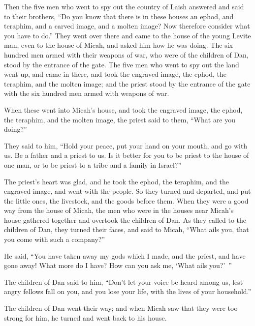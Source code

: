 {\par }{\PP {}Then the five men who went to spy out the country of Laish answered and said to their brothers, “Do you know that there is in these houses an ephod, and teraphim, and a carved image, and a molten image? Now therefore consider what you have to do.”
They went over there and came to the house of the young Levite man, even to the house of Micah, and asked him how he was doing.
The six hundred men armed with their weapons of war, who were of the children of Dan, stood by the entrance of the gate.
The five men who went to spy out the land went up, and came in there, and took the engraved image, the ephod, the teraphim, and the molten image; and the priest stood by the entrance of the gate with the six hundred men armed with weapons of war.
\par }{\PP {}When these went into Micah’s house, and took the engraved image, the ephod, the teraphim, and the molten image, the priest said to them, “What are you doing?”
\par }{\PP {}They said to him, “Hold your peace, put your hand on your mouth, and go with us. Be a father and a priest to us. Is it better for you to be priest to the house of one man, or to be priest to a tribe and a family in Israel?”
\par }{\PP {}The priest’s heart was glad, and he took the ephod, the teraphim, and the engraved image, and went with the people.
So they turned and departed, and put the little ones, the livestock, and the goods before them.
When they were a good way from the house of Micah, the men who were in the houses near Micah’s house gathered together and overtook the children of Dan.
As they called to the children of Dan, they turned their faces, and said to Micah, “What ails you, that you come with such a company?”
\par }{\PP {}He said, “You have taken away my gods which I made, and the priest, and have gone away! What more do I have? How can you ask me, ‘What ails you?’ ”
\par }{\PP {}The children of Dan said to him, “Don’t let your voice be heard among us, lest angry fellows fall on you, and you lose your life, with the lives of your household.”
\par }{\PP {}The children of Dan went their way; and when Micah saw that they were too strong for him, he turned and went back to his house.
}
